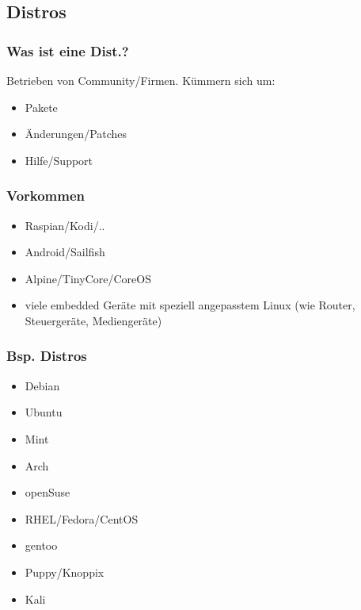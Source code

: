 

\subsection{Distros}
\begin{frame}
\frametitle{Was ist eine Dist.?}
Betrieben von Community/Firmen.
Kümmern sich um: 
\begin{itemize}
 \item Pakete
 \item Änderungen/Patches
 \item Hilfe/Support
\end{itemize}
 
\end{frame}

\begin{frame}
 \frametitle{Vorkommen}

 
 \begin{itemize}
  \item Raspian/Kodi/..
  \item Android/Sailfish
  \item Alpine/TinyCore/CoreOS
  \item viele embedded Geräte mit speziell angepasstem Linux
 (wie Router, Steuergeräte, Mediengeräte)
 \end{itemize}

\end{frame}



\begin{frame}
\frametitle{Bsp. Distros}
\begin{itemize}%
\item Debian
\item Ubuntu
\item Mint
\item Arch
\item openSuse
\item RHEL/Fedora/CentOS 
\item gentoo
\item Puppy/Knoppix 

\item Kali 

\end{itemize}
\end{frame}

